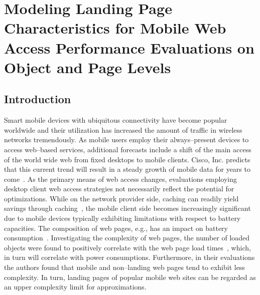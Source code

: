 \chapter{Modeling Landing Page Characteristics for
Mobile Web Access Performance Evaluations on
Object and Page Levels}

\section*{Introduction}
Smart mobile devices with ubiquitous connectivity have become popular worldwide and their utilization has increased the amount of traffic in wireless networks tremendously. 
As mobile users employ their always--present devices to access web--based services, additional forecasts include a shift of the main access of the world wide web from fixed desktops to mobile clients. 
Cisco, Inc. predicts that this current trend will result in a steady growth of mobile data for years to come~\cite{VNI14}.
As the primary means of web access changes, evaluations employing desktop client web access strategies not necessarily reflect the potential for optimizations.
While on the network provider side, caching can readily yield savings through caching~\cite{IhPa11}, the mobile client side becomes increasingly significant due to mobile devices typically exhibiting limitations with respect to battery capacities.
The composition of web pages, e.g., has an impact on battery consumption~\cite{ThAgNiBoSi12}.
Investigating the complexity of web pages, the number of loaded objects were found to positively correlate with the web page load times~\cite{BuMaSe13}, which, in turn will correlate with power consumptions.
Furthermore, in their evaluations the authors found that mobile and non--landing web pages tend to exhibit less complexity. 
In turn, landing pages of popular mobile web sites can be regarded as an upper complexity limit for approximations.

